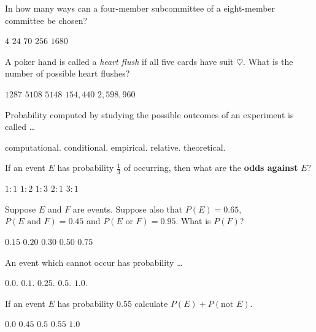 \documentclass[answers,12pt]{exam}
\begin{document}
\begin{questions}
\question In how many ways can a four-member subcommittee
of a eight-member committee be chosen?\\
\begin{oneparchoices}
\choice $4$ %
\choice $24$ %
\correctchoice $70$
\choice $256$ %
\choice $1680$ %
\end{oneparchoices}

\question A poker hand is called a {\em heart flush}
if all five cards have suit $\heartsuit$. What is
the number of possible heart flushes?\\
\begin{oneparchoices}
\correctchoice $1287$
\choice $5108$ %
\choice $5148$ %
\choice $154,440$ %
\choice $2,598,960$ %
\end{oneparchoices}

\question Probability computed by studying
the possible outcomes of an experiment is called \dots\\
\begin{oneparchoices}
\choice computational.
\choice conditional.
\choice empirical.
\choice relative.
\choice theoretical.
\end{oneparchoices}

\question If an event $E$ has probability $\frac{1}{3}$
of occurring, then what are the {\bf odds against} $E$?\\
\begin{oneparchoices}
\choice $1:1$
\choice $1:2$
\choice $1:3$
\correctchoice $2:1$
\choice $3:1$
\end{oneparchoices}

\question Suppose $E$ and $F$ are events.
Suppose also that $P\left(E\right)=0.65$,
$P\left(\text{$E$ and $F$}\right)=0.45$
and $P\left(\text{$E$ or $F$}\right)=0.95$. What
is $P\left(F\right)$?\\
\begin{oneparchoices}
\choice $0.15$ %
\choice $0.20$ %
\choice $0.30$ %
\choice $0.50$ %
\correctchoice $0.75$
\end{oneparchoices}

\question An event which cannot occur has probability \dots\\
\begin{oneparchoices}
\choice $0.0$.
\choice $0.1$.
\choice $0.25$.
\choice $0.5$.
\choice $1.0$.
\end{oneparchoices}

\question If an event $E$ has probability $0.55$
calculate $P\left(E\right)+P\left(\text{not $E$}\right)$.\\
\begin{oneparchoices}
\choice $0.0$
\choice $0.45$
\choice $0.5$
\choice $0.55$
\correctchoice $1.0$
\end{oneparchoices}


\end{questions}
\end{document}
